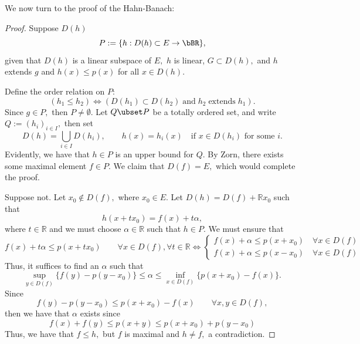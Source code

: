 \documentclass[10pt, oneside]{article}
\newcommand{\bbR}{\mathbb{R}}
\theoremstyle{definition}
\begin{document}
We now turn to the proof of the Hahn-Banach:
\begin{proof}
    Suppose $D(h)$ 
    \[P: = \{h: D(h)\subset E \to \bBR \},\] given that $D(h)$ is a linear subspace of $E,$ $h$ is linear, $G\subset D(h),$ and $h$ extends $g$ and $h(x)\leq p(x)$ for all $x\in D(h).$ 

    Define the order relation on $P:$
    \[(h_1 \leq h_2) \iff (D(h_1) \subset D(h_2) \; \text{and} \; h_2 \; \text{extends} \; h_1).\] Since $g\in P,$ then $P\neq \emptyset.$ Let $Q \ubset P$ be a totally ordered set, and write $Q := (h_i)_{i \in I},$ then set 
    \[D(h) = \bigcup_{i\in I} D(h_i), \qquad h(x) = h_i(x) \quad \text{if $x\in D(h_i)$ for some $i$}.\] Evidently, we have that $h\in P$ is an upper bound for $Q.$ By Zorn, there exists some maximal element $f\in P.$ We claim that $D(f)  = E,$ which would complete the proof.

    Suppose not. Let $x_0 \notin D(f),$ where $x_0 \in E.$ Let $D(h) = D(f) + \bbR x_0$ such that 
    \[h(x + tx_0)= f(x) + t\alpha,\] where $t\in \bbR$ and we must choose $\alpha\in \bbR$ such that $h\in P.$ We must ensure that 
    \[f(x) + t\alpha \leq p(x + tx_0) \qquad \forall x\in D(f), \forall t\in \bbR \iff \begin{cases}
        f(x) + \alpha \leq p(x + x_0)\quad \forall x\in D(f)\\
        f(x) + \alpha \leq p(x - x_0)\quad \forall x\in D(f)
    \end{cases}\]
    Thus, it suffices to find an $\alpha$ such that 
    \[\sup_{y\in D(f)}\{f(y) - p(y - x_0)\} \leq \alpha \leq \inf_{x\in D(f)}\{p(x + x_0) - f(x)\}.\] Since 
    \[f(y) - p(y - x_0) \leq p(x + x_0) - f(x) \qquad \forall x,y \in D(f),\] then we have that $\alpha$ exists since 
    \[f(x) + f(y) \leq p(x + y) \leq p(x + x_0) + p(y - x_0)\] Thus, we have that $f\leq h,$ but $f$ is maximal and $h\neq f,$ a contradiction.
\end{proof}
\newpage
\end{document}
